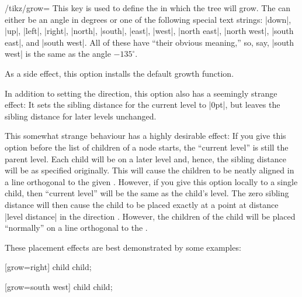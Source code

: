 \begin{key}{/tikz/grow=}
  This key is used to define the  in which the tree
  will grow. The  can either be an angle in degrees or
  one of the following special text strings: |down|, |up|, |left|,
  |right|, |north|, |south|, |east|, |west|, |north east|,
  |north west|, |south east|, and |south west|. All of these have
  ``their obvious meaning,'' so, say, |south west| is the same as the
  angle $-135^\circ$.

  As a side effect, this option installs the default growth function.

  In addition to setting the direction, this option also has a
  seemingly strange effect: It sets the sibling distance for the
  current level to |0pt|, but leaves the sibling distance for later
  levels unchanged.

  This somewhat strange behaviour has a highly desirable effect: If
  you give this option before the list of children of a node starts,
  the ``current level'' is still the parent level. Each child will be
  on a later level and, hence, the sibling distance will be as
  specified originally. This will cause the children to be neatly
  aligned in a line orthogonal to the given . However,
  if you give this option locally to a single child, then ``current
  level'' will be the same as the child's level. The zero sibling
  distance will then cause the child to be placed exactly at a point
  at distance |level distance| in the direction
  . However, the children of the child will be placed
  ``normally'' on a line orthogonal to the .

  These placement effects are best demonstrated by some examples:
\begin{codeexample}[]
\tikz {} [grow=right] child child;
\end{codeexample}

\begin{codeexample}[]
\tikz {} [grow=south west] child child;
\end{codeexample}

\begin{codeexample}[]
\end{codeexample}


\end{key}
